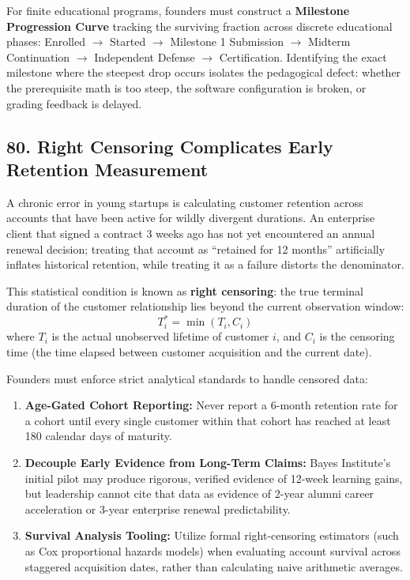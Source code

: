 For finite educational programs, founders must construct a \textbf{Milestone Progression Curve} tracking the surviving fraction across discrete educational phases: Enrolled $\to$ Started $\to$ Milestone 1 Submission $\to$ Midterm Continuation $\to$ Independent Defense $\to$ Certification. Identifying the exact milestone where the steepest drop occurs isolates the pedagogical defect: whether the prerequisite math is too steep, the software configuration is broken, or grading feedback is delayed.

\subsection*{80. Right Censoring Complicates Early Retention Measurement}

A chronic error in young startups is calculating customer retention across accounts that have been active for wildly divergent durations. An enterprise client that signed a contract 3 weeks ago has not yet encountered an annual renewal decision; treating that account as ``retained for 12 months'' artificially inflates historical retention, while treating it as a failure distorts the denominator.

This statistical condition is known as \textbf{right censoring}: the true terminal duration of the customer relationship lies beyond the current observation window:
\begin{equation}
T_i^* = \min(T_i, C_i)
\end{equation}
where $T_i$ is the actual unobserved lifetime of customer $i$, and $C_i$ is the censoring time (the time elapsed between customer acquisition and the current date).

Founders must enforce strict analytical standards to handle censored data:
\begin{enumerate}[leftmargin=*]
\item \textbf{Age-Gated Cohort Reporting:} Never report a 6-month retention rate for a cohort until every single customer within that cohort has reached at least 180 calendar days of maturity.
\item \textbf{Decouple Early Evidence from Long-Term Claims:} Bayes Institute's initial pilot may produce rigorous, verified evidence of 12-week learning gains, but leadership cannot cite that data as evidence of 2-year alumni career acceleration or 3-year enterprise renewal predictability.
\item \textbf{Survival Analysis Tooling:} Utilize formal right-censoring estimators (such as Cox proportional hazards models) when evaluating account survival across staggered acquisition dates, rather than calculating naive arithmetic averages.
\end{enumerate}

